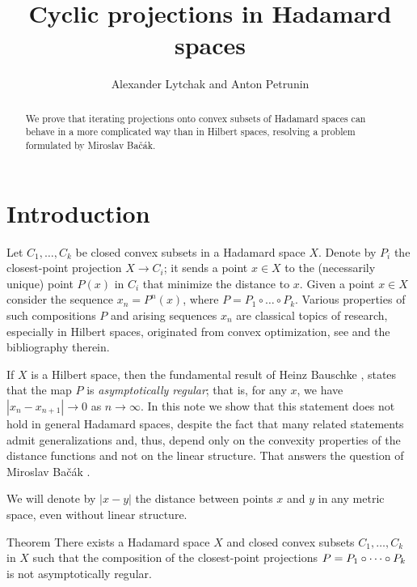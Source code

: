 \documentclass[a4paper,10pt]{article}
\def\thetitle{Cyclic projections in Hadamard spaces}
\def\theauthors{Alexander Lytchak and Anton Petrunin}
\begin{document}
\title{\thetitle}	
\author{\theauthors}
\date{}
\maketitle

\begin{abstract}
	We  prove that iterating projections onto convex subsets of Hadamard spaces can behave in a more complicated way than in Hilbert spaces, resolving a problem formulated by Miroslav Bačák.
\end{abstract}


\section{Introduction}


Let  $C_1,\dots, C_k$ be closed convex subsets in a Hadamard space $X$.
Denote by $P_i$ the closest-point projection $X\to C_i$; it sends a point $x\in X$ to the (necessarily unique) point $P(x)$ in $C_i$ that minimize the distance to $x$.
Given a point $x\in X$ consider the sequence $x_n=P^n(x)$, where
$P= P_1\circ \dots \circ P_k$.
Various properties of such compositions  $P$ and arising  sequences $x_n$
are classical topics of research, especially in Hilbert spaces, originated from convex optimization, see \cite{Bac, Bac2, Bauschke, bauschke-borwein-lewis,deutsch-hundal}
and the bibliography therein.

If $X$ is a Hilbert space, then the fundamental result of Heinz Bauschke \cite{Bauschke,Kohlenbach}, states that the map $P$ is \emph{asymptotically regular}; that is, for any $x$, we have  $|x_n-x_{n+1}|\to 0$ as $n\to \infty$.
In this note we show that this statement does not hold in general Hadamard spaces, despite the fact that many related statements
admit generalizations and, thus, depend only on the convexity properties of the distance functions and not on the linear structure. 
That answers the question of Miroslav Bačák \cite[Problem 6.13]{Bac}.

We will denote by $|x-y|$ the distance between points $x$ and $y$ in any metric space, even without linear structure.

\begin{thm}{Theorem}\label{thm}
There exists a Hadamard space $X$ and closed convex subsets $C_1,\dots,C_k$ in $X$ such that the composition of the closest-point projections $P\z= P_1\circ \dots \circ P_k$ is not asymptotically regular.
\end{thm}
\end{document}
